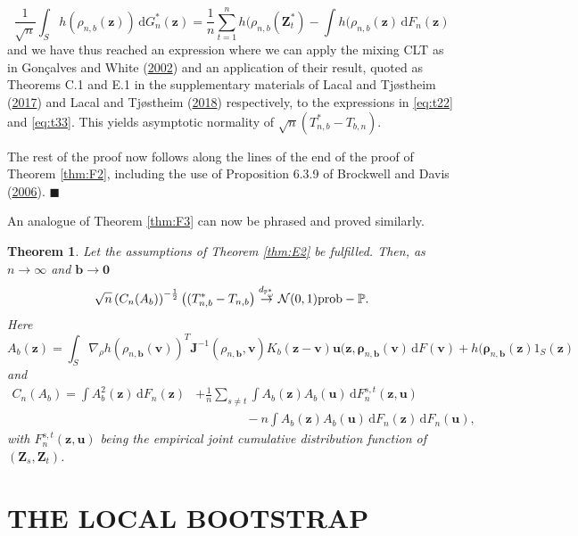 \documentclass[
  12pt,
  letterpaper]{article}
\newtheorem{thm}{Theorem}[section]
\numberwithin{equation}{section}
\newcommand{\Z}{\bm{Z}}
\newcommand{\z}{\bm{z}}
\newcommand{\fv}{\bm{v}}
\newcommand{\fu}{\bm{u}}
\newcommand{\J}{\bm{J}}
\newcommand{\frho}{\bm{\rho}}
\newcommand{\bb}{\bm{b}}
\newcommand{\di}{\,\textrm{d}}
\begin{document}
\begin{equation}
\frac{1}{\sqrt{n}} \int_S h(\rho_{n,b}(\z)) \di G_n^*(\z) = \frac{1}{n}\sum_{t=1}^{n}h(\rho_{n,b}(\Z_t^{*}) - \int h(\rho_{n,b}(\z) \di F_n(\z)
\label{eq:t33}
\end{equation}
and we have thus reached an expression where we can apply the mixing CLT as in Gonçalves and White (\protect\hyperlink{ref-gonccalves2002bootstrap}{2002}) and an application of their result, quoted as Theorems C.1 and E.1 in the supplementary materials of Lacal and Tjøstheim (\protect\hyperlink{ref-lacal2017local}{2017}) and Lacal and Tjøstheim (\protect\hyperlink{ref-lacal2018estimating}{2018}) respectively, to the expressions in \eqref{eq:t22} and \eqref{eq:t33}. This yields asymptotic normality of \(\sqrt{n}(T_{n,b}^*-T_{b,n})\).

The rest of the proof now follows along the lines of the end of the proof of Theorem \ref{thm:F2}, including the use of Proposition 6.3.9 of Brockwell and Davis (\protect\hyperlink{ref-brockwell1991time}{2006}). \(\blacksquare\)

An analogue of Theorem \ref{thm:F3} can now be phrased and proved similarly.

\begin{thm}
Let the assumptions of Theorem \ref{thm:E2} be fulfilled. Then,
as $n \to \infty$ and $\bb \to \bm{0}$
$$
\sqrt{n}\left(C_{n}(A_b)\right)^{-\frac{1}{2}}\left((T_{n,b}^* - T_{n,b}\right) \buildrel {d_{\mathbb{P}_{\omega}^*}} \over {\to} {\cal N}(0,1)\mbox{prob}-\mathbb{P}.
$$
Here 
$$
A_b(\z) = \int_S \nabla_{\rho}h(\rho_{n,\bb}(\fv))^{T}{\J}^{-1}(\rho_{n,\bb},\fv)K_b(\z-\fv)\fu(\z,\frho_{n,\bb}(\fv) \di F(\fv) + h(\frho_{n,\bb}(\z)1_S(\z)
$$
and 
\begin{align*}
C_n(A_b) = \int A_b^2(\z) \di F_n(\z) &+ \frac{1}{n}\sum_{s \neq t}\int A_b(\z)A_b(\fu) \di F_n^{s,t}(\z,\fu) \\ & \qquad\qquad- n\int A_b(\z)A_b(\fu)\di F_n(\z) \di F_n(\fu),
\end{align*}
with $F_n^{s,t}(\z,\fu)$ being the empirical joint cumulative distribution function of $(\Z_s,\Z_t)$.
\label{thm:H2}
\end{thm}

\hypertarget{the-local-bootstrap}{%
\section{THE LOCAL BOOTSTRAP}\label{the-local-bootstrap}}
\end{document}
